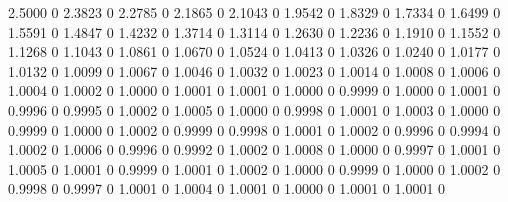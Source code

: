     2.5000         0
    2.3823         0
    2.2785         0
    2.1865         0
    2.1043         0
    1.9542         0
    1.8329         0
    1.7334         0
    1.6499         0
    1.5591         0
    1.4847         0
    1.4232         0
    1.3714         0
    1.3114         0
    1.2630         0
    1.2236         0
    1.1910         0
    1.1552         0
    1.1268         0
    1.1043         0
    1.0861         0
    1.0670         0
    1.0524         0
    1.0413         0
    1.0326         0
    1.0240         0
    1.0177         0
    1.0132         0
    1.0099         0
    1.0067         0
    1.0046         0
    1.0032         0
    1.0023         0
    1.0014         0
    1.0008         0
    1.0006         0
    1.0004         0
    1.0002         0
    1.0000         0
    1.0001         0
    1.0001         0
    1.0000         0
    0.9999         0
    1.0000         0
    1.0001         0
    0.9996         0
    0.9995         0
    1.0002         0
    1.0005         0
    1.0000         0
    0.9998         0
    1.0001         0
    1.0003         0
    1.0000         0
    0.9999         0
    1.0000         0
    1.0002         0
    0.9999         0
    0.9998         0
    1.0001         0
    1.0002         0
    0.9996         0
    0.9994         0
    1.0002         0
    1.0006         0
    0.9996         0
    0.9992         0
    1.0002         0
    1.0008         0
    1.0000         0
    0.9997         0
    1.0001         0
    1.0005         0
    1.0001         0
    0.9999         0
    1.0001         0
    1.0002         0
    1.0000         0
    0.9999         0
    1.0000         0
    1.0002         0
    0.9998         0
    0.9997         0
    1.0001         0
    1.0004         0
    1.0001         0
    1.0000         0
    1.0001         0
    1.0001         0